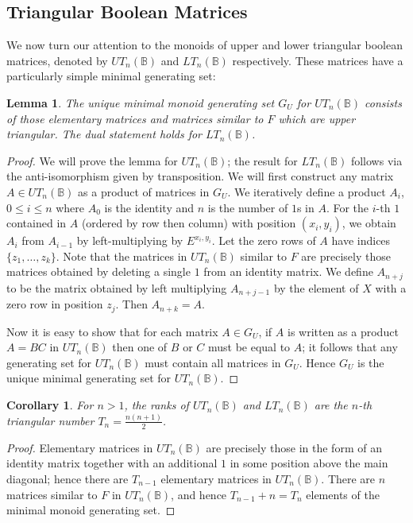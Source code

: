 \documentclass[11pt]{article}
\newtheorem{cor}[thm]{Corollary}
\newtheorem{lemma}[thm]{Lemma}
\numberwithin{equation}{section}
\newcommand{\B}{\mathbb{B}}
\newcommand{\UTn}{UT_n(\B)}
\newcommand{\LTn}{LT_n(\B)}
\begin{document}
\subsection{Triangular Boolean Matrices}
\label{sec:TriBoolMat}
We now turn our attention to the monoids of upper and lower triangular boolean
matrices, denoted by $\UTn$ and $\LTn$ respectively. These matrices have a
particularly simple minimal generating set:

\begin{lemma}
  The unique minimal monoid generating set $G_U$ for $\UTn$ consists of those
  elementary matrices and matrices similar to $F$ which are upper triangular.
  The dual statement holds for $\LTn$.
\end{lemma}

\begin{proof}
  We will prove the lemma for $\UTn$; the result for $\LTn$ follows via the
  anti-isomorphism given by transposition.
  We will first construct any matrix $A \in \UTn$ as a product of matrices in
  $G_U$. We iteratively define a product $A_i$, $0 \leq i \leq n$ where $A_0$ is
  the identity and $n$ is the number of $1$s in $A$. For the $i$-th $1$
  contained in $A$ (ordered by row then column) with position $(x_i, y_i)$, we
  obtain $A_i$ from $A_{i - 1}$ by left-multiplying by $E^{x_i, y_i}$. Let the
  zero rows of $A$ have indices $\{z_1, \ldots, z_{k}\}$. Note that the matrices
  in $\UTn$ similar to $F$ are precisely those matrices obtained by deleting a
  single $1$ from an identity matrix. We define $A_{n + j}$ to be the matrix
  obtained by left multiplying $A_{n + j - 1}$ by the element of $X$ with a zero
  row in position $z_j$. Then $A_{n + k} = A$.  
  
  Now it is easy to show that for each matrix $A \in G_U$, if $A$ is written as
  a product $A = BC$ in $\UTn$ then one of $B$ or $C$ must be equal to $A$; it
  follows that any generating set for $\UTn$ must contain all matrices in $G_U$.
  Hence $G_U$ is the unique minimal generating set for $\UTn$.
\end{proof}

\begin{cor}
  For $n > 1$, the ranks of $\UTn$ and $\LTn$ are the $n$-th triangular number
  $T_n = \frac{n(n+1)}{2}$.
\end{cor}
\begin{proof}
  Elementary matrices in $\UTn$ are precisely those in the form of an identity
  matrix together with an additional $1$ in some position above the main
  diagonal; hence there are $T_{n - 1}$ elementary matrices in $\UTn$. There are
  $n$ matrices similar to $F$ in $\UTn$, and hence $T_{n - 1} + n =  T_n$
  elements of the minimal monoid generating set.
\end{proof}
\end{document}
